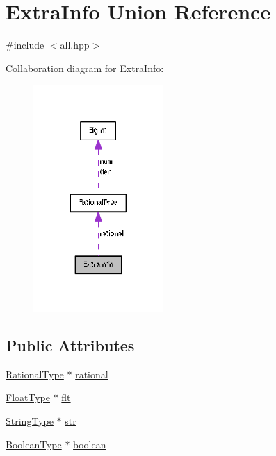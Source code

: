 \hypertarget{union_extra_info}{}\section{Extra\+Info Union Reference}
\label{union_extra_info}


{\ttfamily \#include $<$all.\+hpp$>$}



Collaboration diagram for Extra\+Info\+:
\nopagebreak
\begin{figure}[H]
\begin{center}
\leavevmode
\includegraphics[width=140pt]{union_extra_info__coll__graph}
\end{center}
\end{figure}
\subsection*{Public Attributes}
\begin{DoxyCompactItemize}
\item 
\hyperlink{class_rational_type}{Rational\+Type} $\ast$ \hyperlink{union_extra_info_a454286653cbc574463a4cf114cd2d89e}{rational}
\item 
\hyperlink{float_8hpp_a262844e4d29c844e2c448abe0ce82f14}{Float\+Type} $\ast$ \hyperlink{union_extra_info_a6666187612fd771c8a8965a3de25d548}{flt}
\item 
\hyperlink{string_8hpp_ae96f7e0a0a27a61d630bd0e90e5fb7be}{String\+Type} $\ast$ \hyperlink{union_extra_info_abdaf052f1a3cbb9063acc703433e081c}{str}
\item 
\hyperlink{boolean_8hpp_a0302c79f6d6b93d902af278d1191e054}{Boolean\+Type} $\ast$ \hyperlink{union_extra_info_aca965abbb21d8d62613031fd4c335d82}{boolean}
\end{DoxyCompactItemize}


